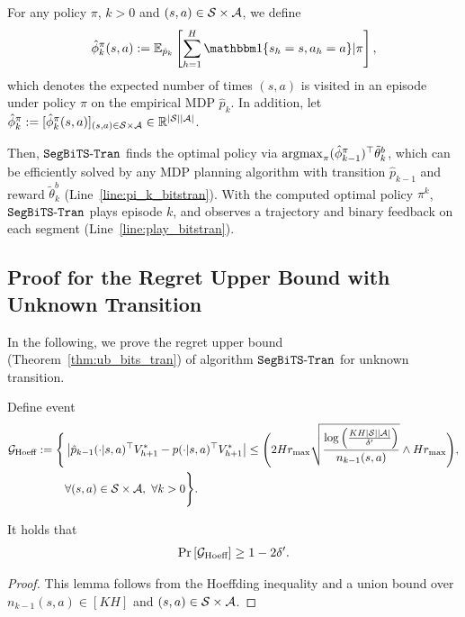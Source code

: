 For any policy $\pi$, $k>0$ and $(s,a) \in \mathcal{S} \times \mathcal{A}$, we define 
\begin{align}
	\hat{\phi}^{\pi}_k(s,a):=\ex_{\hat{p}_k}\mbr{ \sum_{h=1}^{H} \indicator\{s_h=s, a_h=a\} | \pi } , \label{eq:def_hat_phi}
\end{align}
which denotes the expected number of times $(s,a)$ is visited in an episode under policy $\pi$ on the empirical MDP $\hat{p}_k$.
In addition, let $\hat{\phi}^{\pi}_k:=[\hat{\phi}^{\pi}_k(s,a)]_{(s,a) \in \mathcal{S} \times \mathcal{A}} \in \mathbb{R}^{|\mathcal{S}||\mathcal{A}|}$.

Then, $\mathtt{SegBiTS\mbox{-}Tran}$ finds the optimal policy via $\argmax_{\pi} (\hat{\phi}^{\pi}_{k-1})^\top \tilde{\theta}^{b}_k$, which can be efficiently solved by any MDP planning algorithm with transition $\hat{p}_{k-1}$ and reward $\tilde{\theta}^{b}_k$ (Line~\ref{line:pi_k_bitstran}). With the computed optimal policy $\pi^k$,  $\mathtt{SegBiTS\mbox{-}Tran}$ plays episode $k$, and observes a trajectory and binary feedback on each segment (Line~\ref{line:play_bitstran}).


\subsection{Proof for the Regret Upper Bound with Unknown Transition}

In the following, we prove the regret upper bound (Theorem~\ref{thm:ub_bits_tran}) of algorithm $\mathtt{SegBiTS\mbox{-}Tran}$ for unknown transition.

Define event
\begin{align*}
	\mathcal{G}_{\textup{Hoeff}}:=\Biggl\{  &\left| \hat{p}_{k-1}(\cdot|s,a)^\top V^*_{h+1} - p(\cdot|s,a)^\top V^*_{h+1} \right| \leq \Bigg( 2H r_{\max} \sqrt{\frac{\log\left( \frac{KH|\mathcal{S}||\mathcal{A}|}{\delta'} \right)}{n_{k-1}(s,a)}} \wedge Hr_{\max} \Bigg) , 
	\\
	&\forall (s,a) \in \mathcal{S} \times \mathcal{A},\ \forall k>0 \Biggr\} .
\end{align*}
\begin{lemma}
	It holds that
	\begin{align*}
		\Pr\left[  \mathcal{G}_{\textup{Hoeff}}  \right] \geq 1-2\delta' .
	\end{align*}
\end{lemma}
\begin{proof}
	This lemma follows from the Hoeffding inequality and a union bound over $n_{k-1}(s,a) \in [KH]$ and $(s,a) \in \mathcal{S} \times \mathcal{A}$.
\end{proof}

